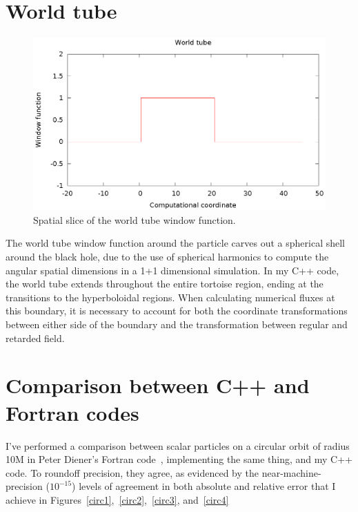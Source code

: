 \section{World tube}
\begin{figure}
\includegraphics{worldTubeItself}
\caption{Spatial slice of the world tube window function.}
\label{wtwindow}
\end{figure}

The world tube window function around the particle carves out a spherical shell around the black hole, due to the use of spherical harmonics to compute the angular spatial dimensions in a 1+1 dimensional simulation. In my C++ code, the world tube extends throughout the entire tortoise region, ending at the transitions to the hyperboloidal regions. When calculating numerical fluxes at this boundary, it is necessary to account for both the coordinate transformations between either side of the boundary and the transformation between regular and retarded field.




\section{Comparison between C++ and Fortran codes}

I've performed a comparison between scalar particles on a circular orbit of radius 10M in Peter Diener's Fortran code~\cite{heffernan_ottewil_wardell_modesum_basisForCode}, implementing the same thing, and my C++ code. To roundoff precision, they agree, as evidenced by the near-machine-precision ($10^{-15}$) levels of agreement in both absolute and relative error that I achieve in Figures~\ref{circ1},~\ref{circ2},~\ref{circ3}, and~\ref{circ4}

